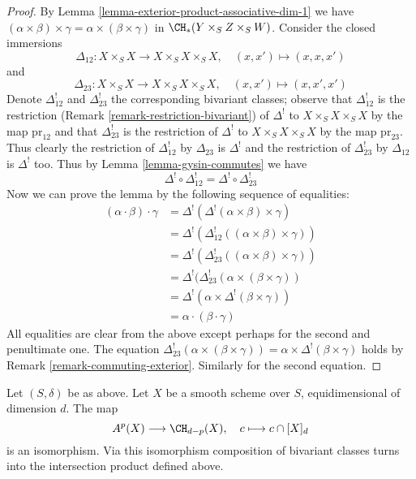 \begin{proof}
By Lemma \ref{lemma-exterior-product-associative-dim-1} we have
$(\alpha \times \beta) \times \gamma =
\alpha \times (\beta \times \gamma)$ in $\CH_*(Y \times_S Z \times_S W)$.
Consider the closed immersions
$$
\Delta_{12} : X \times_S X \longrightarrow X \times_S X \times_S X,
\quad (x, x') \mapsto (x, x, x')
$$
and
$$
\Delta_{23} : X \times_S X \longrightarrow X \times_S X \times_S X,
\quad (x, x') \mapsto (x, x', x')
$$
Denote $\Delta_{12}^!$ and $\Delta_{23}^!$ the corresponding bivariant
classes; observe that $\Delta_{12}^!$ is the restriction
(Remark \ref{remark-restriction-bivariant}) of $\Delta^!$
to $X \times_S X \times_S X$ by the map $\text{pr}_{12}$ and that
$\Delta_{23}^!$ is the restriction of $\Delta^!$
to $X \times_S X \times_S X$ by the map $\text{pr}_{23}$.
Thus clearly the restriction of $\Delta_{12}^!$ by $\Delta_{23}$
is $\Delta^!$ and the restriction of $\Delta_{23}^!$ by $\Delta_{12}$ is
$\Delta^!$ too. Thus by Lemma \ref{lemma-gysin-commutes} we have
$$
\Delta^! \circ \Delta_{12}^! =
\Delta^! \circ \Delta_{23}^! 
$$
Now we can prove the lemma by the following sequence of equalities:
\begin{align*}
(\alpha \cdot \beta) \cdot \gamma
& =
\Delta^!(\Delta^!(\alpha \times \beta) \times \gamma) \\
& =
\Delta^!(\Delta_{12}^!((\alpha \times \beta) \times \gamma)) \\
& =
\Delta^!(\Delta_{23}^!((\alpha \times \beta) \times \gamma)) \\
& =
\Delta^!(\Delta_{23}^!(\alpha \times (\beta \times \gamma)) \\
& =
\Delta^!(\alpha \times \Delta^!(\beta \times \gamma)) \\
& =
\alpha \cdot (\beta \cdot \gamma)
\end{align*}
All equalities are clear from the above except perhaps
for the second and penultimate one. The equation
$\Delta_{23}^!(\alpha \times (\beta \times \gamma)) =
\alpha \times \Delta^!(\beta \times \gamma)$ holds by
Remark \ref{remark-commuting-exterior}. Similarly for the second
equation.
\end{proof}

\begin{lemma}
\label{lemma-identify-chow-for-smooth-dim-1}
Let $(S, \delta)$ be as above. Let $X$ be a smooth scheme over $S$,
equidimensional of dimension $d$. The map
$$
A^p(X) \longrightarrow \CH_{d - p}(X),\quad
c \longmapsto c \cap [X]_d
$$
is an isomorphism. Via this isomorphism composition of bivariant
classes turns into the intersection product defined above.
\end{lemma}

